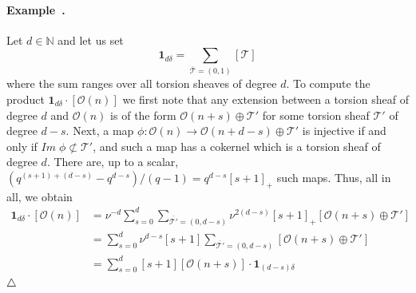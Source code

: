 \documentclass[a4paper,10pt]{amsart}
\def\endexample{$\hfill \triangle$}
\def\N{\mathbb{N}}
\def\O{\mathcal{O}}
\numberwithin{equation}{section}
\begin{document}
\paragraph{\textbf{Example~\thetheo.}} Let $d \in \N$ and let us set
$$\mathbf{1}_{d\delta}=\sum_{\overline{\mathcal{T}}=(0,1)} [\mathcal{T}]$$
where the sum ranges over all torsion sheaves of degree $d$. To compute the product $\mathbf{1}_{d\delta}\cdot [\O(n)]$ we first note that any extension between a torsion sheaf of degree $d$ and $\O(n)$ is of the form $\O(n+s) \oplus \mathcal{T}'$ for some torsion sheaf $\mathcal{T}'$ of degree $d-s$. Next, a map $\phi: \mathcal{O}(n) \to \mathcal{O}(n+d-s) \oplus \mathcal{T}'$ is injective if and only if ${Im}\;\phi \not\subset \mathcal{T}'$, and such a map has a cokernel which is a torsion sheaf of degree $d$. There are, up to a scalar, $(q^{(s+1)+(d-s)}-q^{d-s})/(q-1)=q^{d-s}[s+1]_+$ such maps. Thus, all in all, we obtain
\begin{equation}\label{E:product1rdo}
\begin{split}
\mathbf{1}_{d\delta}\cdot [\O(n)]&=\nu^{-d} \sum_{s=0}^d \sum_{\overline{\mathcal{T}'}=(0,d-s)}\nu^{2(d-s)}[s+1]_+[\mathcal{O}(n+s)\oplus \mathcal{T}']\\
&=\sum_{s=0}^d \nu^{d-s} [s+1]\sum_{\overline{\mathcal{T}'}=(0,d-s)}[\mathcal{O}(n+s)\oplus \mathcal{T}']\\
&=\sum_{s=0}^d [s+1] [\mathcal{O}(n+s)] \cdot \mathbf{1}_{(d-s)\delta}
\end{split}
\end{equation}
\endexample

\vspace{.15in}

\addtocounter{theo}{1}
\end{document}
